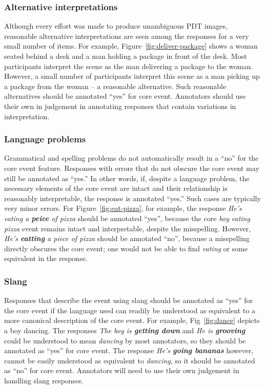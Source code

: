 \documentclass[12pt,notitlepage]{article}
\begin{document}
\subsubsection{Alternative interpretations} Although every effort was made to produce unambiguous PDT images, reasonable alternative interpretations are seen among the responses for a very small number of items. For example, Figure~\ref{fig:deliver-package} shows a woman seated behind a desk and a man holding a package in front of the desk. Most participants interpret the scene as the man delivering a package to the woman. However, a small number of participants interpret this scene as a man picking up a package from the woman -- a reasonable alternative. Such reasonable alternatives should be annotated ``yes'' for core event. Annotators should use their own in judgement in annotating responses that contain variations in interpretation.

\subsubsection{Language problems} Grammatical and spelling problems do not automatically result in a ``no'' for the core event feature. Responses with errors that do not obscure the core event may still be annotated as ``yes.'' In other words, if, despite a language problem, the necessary elements of the core event are intact and their relationship is reasonably interpretable, the response is annotated ``yes.'' Such cases are typically very minor errors. For Figure~\ref{fig:eat-pizza}, for example, the response \textit{He's eating a \textbf{peice} of pizza} should be annotated ``yes'', because the core \textit{boy eating pizza} event remains intact and interpretable, despite the misspelling. However, \textit{He's \textbf{eatting} a piece of pizza} should be annotated ``no'', because a misspelling directly obscures the core event; one would not be able to find \textit{eating} or some equivalent in the response.

\subsubsection{Slang} Responses that describe the event using slang should be annotated as ``yes'' for the core event if the language used can readily be understood as equivalent to a more canonical description of the core event. For example, Fig~\ref{fig:dance} depicts a boy dancing. The responses \textit{The boy is \textbf{getting down}} and \textit{He is \textbf{grooving}} could be understood to mean \textit{dancing} by most annotators, so they should be annotated as ``yes'' for core event. The response \textit{He's \textbf{going bananas}} however, cannot be easily understood as equivalent to \textit{dancing}, so it should be annotated as ``no'' for core event. Annotators will need to use their own judgement in handling slang responses.
\end{document}
